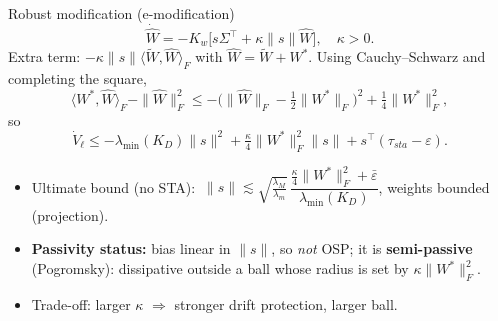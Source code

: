 \documentclass[aspectratio=169,10pt]{beamer}
\newcommand{\lmin}{\lambda_{\min}}
\begin{document}
\begin{frame}{Robust modification (e-modification)}
\[
\dot{\hat W}=-K_w\big[s\Sigma^\top+\kappa\|s\|\hat W\big],\quad\kappa>0 .
\]
Extra term: $-\kappa\|s\|\langle\tilde W,\hat W\rangle_F$ with $\hat W=\tilde W+W^*$. Using Cauchy--Schwarz and completing the square,
\[
\langle W^*,\hat W\rangle_F-\|\hat W\|_F^2\le-\big(\|\hat W\|_F-\tfrac12\|W^*\|_F\big)^2+\tfrac14\|W^*\|_F^2 ,
\]
so
\[
\dot V_\ell\le-\lmin(K_D)\|s\|^2+\tfrac\kappa4\|W^*\|_F^2\|s\|+s^\top(\tau_{sta}-\varepsilon).
\]
\begin{itemize}
\item Ultimate bound (no STA): $\ \|s\|\lesssim\sqrt{\tfrac{\lambda_M}{\lambda_m}}\,\dfrac{\frac\kappa4\|W^*\|_F^2+\bar\varepsilon}{\lmin(K_D)}$, weights bounded (projection).
\item \textbf{Passivity status:} bias linear in $\|s\|$, so \emph{not} OSP; it is \textbf{semi-passive} (Pogromsky): dissipative outside a ball whose radius is set by $\kappa\|W^*\|_F^2$.
\item Trade-off: larger $\kappa$ $\Rightarrow$ stronger drift protection, larger ball.
\end{itemize}
\end{frame}

\end{document}
